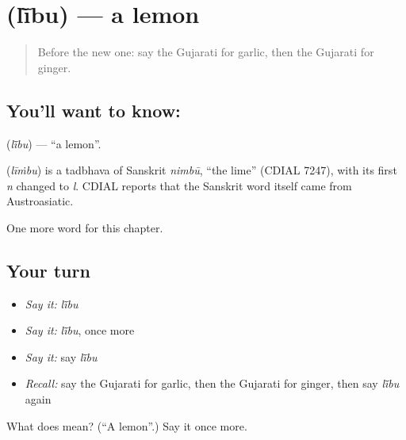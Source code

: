 \section[\texorpdfstring{\gu{લીંબુ} (lī̃bu)}{લીંબુ (lī̃bu)}]{ (lī̃bu) — a lemon}

\label{lesson:GU-C115-libu}



\begin{quote}
Before the new one: say the Gujarati for garlic, then the Gujarati for ginger.
\end{quote}

\subsection*{You'll want to know: }
\textbf{} (\emph{lī̃bu}) — \textquotedblleft{}a lemon\textquotedblright{}.

\begin{cousinweb}
\textbf{} (\emph{līṁbu}) is a tadbhava of Sanskrit \emph{nimbū}, \textquotedblleft{}the lime\textquotedblright{} (CDIAL 7247), with its first \emph{n} changed to \emph{l}. CDIAL reports that the Sanskrit word itself came from Austroasiatic.
\end{cousinweb}

\begin{grammarlens}[title={What you've built}]
One more word for this chapter.
\end{grammarlens}

\subsection*{Your turn}
\begin{itemize}
\raggedright
  \item \emph{Say it:} \emph{lī̃bu}
  \item \emph{Say it:} \emph{lī̃bu}, once more
  \item \emph{Say it:} say \emph{lī̃bu}
  \item \emph{Recall:} say the Gujarati for garlic, then the Gujarati for ginger, then say \emph{lī̃bu} again
\end{itemize}

\begin{tcolorbox}[breakable,colback=teal!4,colframe=teal!35!black,title={Before you move on}]
What does  mean? (\textquotedblleft{}A lemon\textquotedblright{}.) Say it once more.
\end{tcolorbox}
